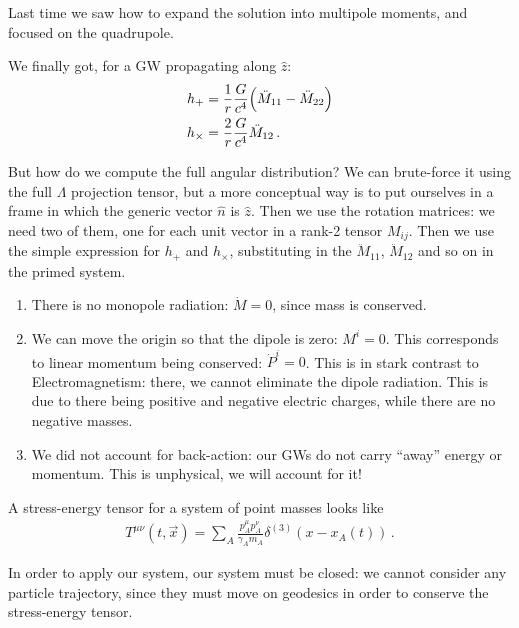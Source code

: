 \documentclass[main.tex]{subfiles}
\begin{document}

Last time we saw how to expand the solution into multipole moments, and focused on the quadrupole. 

We finally got, for a GW propagating along \(\hat{z}\): 
%
\begin{subequations}
\begin{align}
h_{+} &= \frac{1}{r} \frac{G}{c^{4}} \qty(\ddot{M}_{11} - \ddot{M}_{22})  \\
h_{ \times } &= \frac{2}{r} \frac{G}{c^{4}} \ddot{M}_{12}
\,.
\end{align}
\end{subequations}

But how do we compute the full angular distribution? 
We can brute-force it using the full \(\Lambda \) projection tensor, but a more conceptual way is to put ourselves in a frame in which the generic vector \(\hat{n}\) is \(\hat{z}\). 
Then we use the rotation matrices: we need two of them, one for each unit vector in a rank-2 tensor \(M_{ij}\). 
Then we use the simple expression for \(h_{+}\) and \(h_{ \times }\), substituting in the \(\ddot{M}_{11}\), \(\ddot{M}_{12}\) and so on in the primed system. 

\begin{enumerate}
  \item There is no monopole radiation: \(\dot{M} = 0\), since mass is conserved.
  \item We can move the origin so that the dipole is zero: \(M^{i} =0 \). This corresponds to linear momentum being conserved: \(\dot{P}^{i}=0\). This is in stark contrast to Electromagnetism: there, we cannot eliminate the dipole radiation. This is due to there being positive and negative electric charges, while there are no negative masses. 
  \item We did not account for back-action: our GWs do not carry ``away'' energy or momentum. This is unphysical, we will account for it!
\end{enumerate}

A stress-energy tensor for a system of point masses looks like 
%
\begin{align}
T^{\mu \nu }(t, \vec{x}) = \sum _{A} \frac{p^{\mu }_{A} p^{\nu }_{A}}{\gamma_{A}  m_{A}} \delta^{(3)} (x - x_{A}(t))
\,.
\end{align}

In order to apply our system, our system must be closed: we cannot consider any particle trajectory, since they must move on geodesics in order to conserve the stress-energy tensor. 
\end{document}
